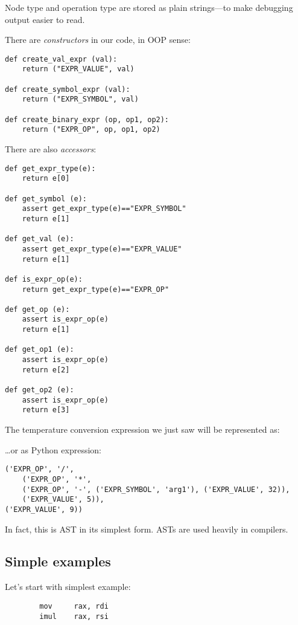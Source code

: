 Node type and operation type are stored as plain strings---to make debugging output easier to read.

There are \textit{constructors} in our code, in \ac{OOP} sense:

\begin{lstlisting}
def create_val_expr (val):
    return ("EXPR_VALUE", val)

def create_symbol_expr (val):
    return ("EXPR_SYMBOL", val)

def create_binary_expr (op, op1, op2):
    return ("EXPR_OP", op, op1, op2)
\end{lstlisting}

There are also \textit{accessors}:

\begin{lstlisting}
def get_expr_type(e):
    return e[0]

def get_symbol (e):
    assert get_expr_type(e)=="EXPR_SYMBOL"
    return e[1]

def get_val (e):
    assert get_expr_type(e)=="EXPR_VALUE"
    return e[1]

def is_expr_op(e):
    return get_expr_type(e)=="EXPR_OP"

def get_op (e):
    assert is_expr_op(e)
    return e[1]

def get_op1 (e):
    assert is_expr_op(e)
    return e[2]

def get_op2 (e):
    assert is_expr_op(e)
    return e[3]
\end{lstlisting}

The temperature conversion expression we just saw will be represented as:



\dots or as Python expression:

\begin{lstlisting}
('EXPR_OP', '/', 
	('EXPR_OP', '*',
	('EXPR_OP', '-', ('EXPR_SYMBOL', 'arg1'), ('EXPR_VALUE', 32)), 
	('EXPR_VALUE', 5)), 
('EXPR_VALUE', 9))
\end{lstlisting}

In fact, this is \ac{AST} in its simplest form.
\ac{AST}s are used heavily in compilers.

\subsection{Simple examples}

Let's start with simplest example:

\begin{lstlisting}
        mov     rax, rdi
        imul    rax, rsi
\end{lstlisting}


